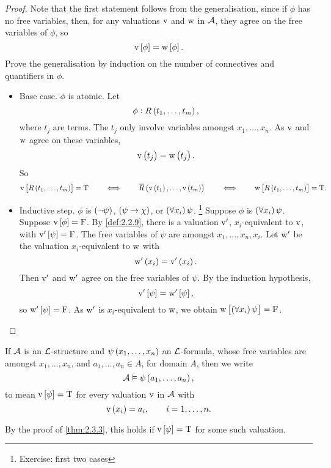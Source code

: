 \begin{proof}
Note that the first statement follows from the generalisation, since if $ \phi $ has no free variables, then, for any valuations $ \mathrm{v} $ and $ \mathrm{w} $ in $ \mathcal{A} $, they agree on the free variables of $ \phi $, so
$$ \v\sbr{\phi} = \w\sbr{\phi}. $$
Prove the generalisation by induction on the number of connectives and quantifiers in $ \phi $.
\begin{itemize}
\item Base case. $ \phi $ is atomic. Let
$$ \phi : R\br{t_1, \dots, t_m}, $$
where $ t_j $ are terms. The $ t_j $ only involve variables amongst $ x_1, \dots, x_n $. As $ \mathrm{v} $ and $ \mathrm{w} $ agree on these variables,
$$ \v\br{t_j} = \w\br{t_j}. $$
So
$$ \v\sbr{R\br{t_1, \dots, t_m}} = \T \qquad \iff \qquad \overline{R}\br{\v\br{t_1}, \dots, \v\br{t_m}} \qquad \iff \qquad \w\sbr{R\br{t_1, \dots, t_m}} = \T. $$
\item Inductive step. $ \phi $ is $ \notb{\psi} $, $ \impb{\psi}{\chi} $, or $ \fab{x_i}\psi $. \footnote{Exercise: first two cases} Suppose $ \phi $ is $ \fab{x_i}\psi $. Suppose $ \v\sbr{\phi} = \F $. By \ref{def:2.2.9}, there is a valuation $ \mathrm{v}' $, $ x_i $-equivalent to $ \mathrm{v} $, with $ \v'\sbr{\psi} = \F $. The free variables of $ \psi $ are amongst $ x_1, \dots, x_n, x_i $. Let $ \mathrm{w}' $ be the valuation $ x_i $-equivalent to $ \mathrm{w} $ with
$$ \w'\br{x_i} = \v'\br{x_i}. $$
Then $ \mathrm{v}' $ and $ \mathrm{w}' $ agree on the free variables of $ \psi $. By the induction hypothesis,
$$ \v'\sbr{\psi} = \w'\sbr{\psi}, $$
so $ \w'\sbr{\psi} = \F $. As $ \mathrm{w}' $ is $ x_i $-equivalent to $ \mathrm{w} $, we obtain $ \w\sbr{\fab{x_i}\psi} = \F $.
\end{itemize}
\end{proof}


\begin{remark}
If $ \mathcal{A} $ is an $ \mathcal{L} $-structure and $ \psi\br{x_1, \dots, x_n} $ an $ \mathcal{L} $-formula, whose free variables are amongst $ x_1, \dots, x_n $, and $ a_1, \dots, a_n \in A $, for domain $ A $, then we write
$$ \AAA \vDash \psi\br{a_1, \dots, a_n}, $$
to mean $ \v\sbr{\psi} = \T $ for every valuation $ \mathrm{v} $ in $ \mathcal{A} $ with
$$ \v\br{x_i} = a_i, \qquad i = 1, \dots, n. $$
\end{remark}

\begin{remark*}
By the proof of \ref{thm:2.3.3}, this holds if $ \v\sbr{\psi} = \T $ for some such valuation.
\end{remark*}

